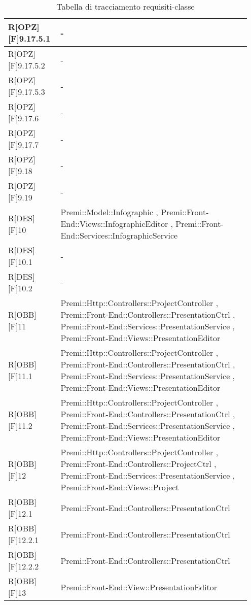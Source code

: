 \newpage
\begin{table}[h]
	\begin{center}
		\begin{tabular}{|p{0.2\linewidth}|p{0.75\linewidth}|}
			\toprule
			R[OPZ][F]9.17.5.1 & -\\
		\midrule
			R[OPZ][F]9.17.5.2 & -\\
		\midrule
			R[OPZ][F]9.17.5.3 & -\\
		\midrule
			R[OPZ][F]9.17.6 & -\\
		\midrule
			R[OPZ][F]9.17.7 & -\\
		\midrule
			R[OPZ][F]9.18 & -\\
		\midrule
			R[OPZ][F]9.19 & -\\
		\midrule
			R[DES][F]10 & Premi::Model::Infographic , Premi::Front-End::Views::InfographicEditor , Premi::Front-End::Services::InfographicService\\
		\midrule
			R[DES][F]10.1 & -\\
		\midrule
			R[DES][F]10.2 & -\\
		\midrule
			R[OBB][F]11 & Premi::Http::Controllers::ProjectController , Premi::Front-End::Controllers::PresentationCtrl , Premi::Front-End::Services::PresentationService , Premi::Front-End::Views::PresentationEditor\\
		\midrule
			R[OBB][F]11.1 & Premi::Http::Controllers::ProjectController , Premi::Front-End::Controllers::PresentationCtrl , Premi::Front-End::Services::PresentationService , Premi::Front-End::Views::PresentationEditor\\
		\midrule
			R[OBB][F]11.2 & Premi::Http::Controllers::ProjectController , Premi::Front-End::Controllers::PresentationCtrl , Premi::Front-End::Services::PresentationService , Premi::Front-End::Views::PresentationEditor\\
		\midrule
			R[OBB][F]12 & Premi::Http::Controllers::ProjectController , Premi::Front-End::Controllers::ProjectCtrl , Premi::Front-End::Services::PresentationService , Premi::Front-End::Views::Project\\
		\midrule
			R[OBB][F]12.1 & Premi::Front-End::Controllers::PresentationCtrl\\
		\midrule
			R[OBB][F]12.2.1 & Premi::Front-End::Controllers::PresentationCtrl\\
		\midrule
			R[OBB][F]12.2.2 & Premi::Front-End::Controllers::PresentationCtrl\\
		\midrule
			R[OBB][F]13 & Premi::Front-End::View::PresentationEditor\\
			\bottomrule
		\end{tabular}
	\end{center}
	\caption{Tabella di tracciamento requisiti-classe}
\end{table}
\newpage